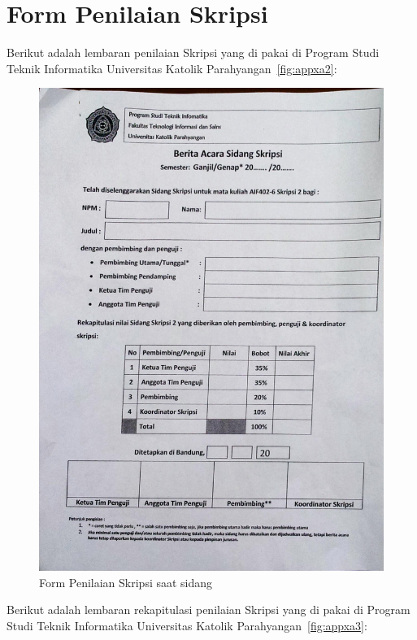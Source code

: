 \chapter{Form Penilaian Skripsi}
\label{app:A}

Berikut adalah lembaran penilaian Skripsi yang di pakai di Program Studi Teknik Informatika Universitas Katolik Parahyangan~\ref{fig:appxa2}:

\begin{figure}[H]
\centering
\includegraphics[scale=0.20]{Gambar/dokumen_skripsi}
\caption[Form Penilaian Skripsi saat sidang]{Form Penilaian Skripsi saat sidang} 
\label{fig: skripsiAsli}
\end{figure}
\pagebreak
Berikut adalah lembaran rekapitulasi penilaian Skripsi yang di pakai di Program Studi Teknik Informatika Universitas Katolik Parahyangan~\ref{fig:appxa3}:

